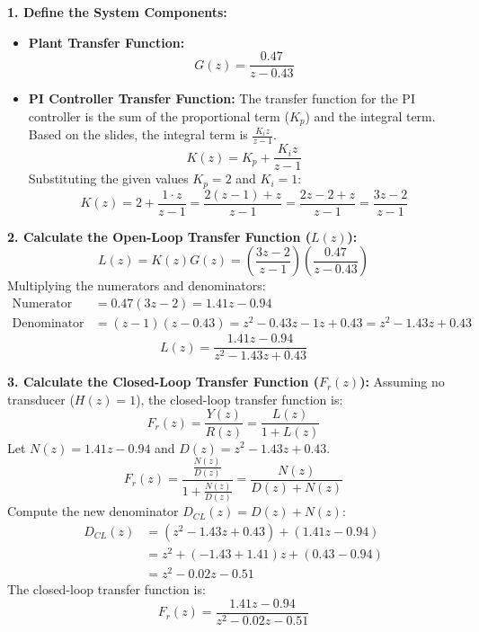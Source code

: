 \documentclass[a4paper,12pt]{article}
\begin{document}
\section{}

\textbf{1. Define the System Components:}
\begin{itemize}
    \item \textbf{Plant Transfer Function:}
    \[ G(z) = \frac{0.47}{z - 0.43} \]
    \item \textbf{PI Controller Transfer Function:}
    The transfer function for the PI controller is the sum of the proportional term ($K_p$) and the integral term. Based on the slides, the integral term is $\frac{K_i z}{z-1}$.
    \[ K(z) = K_p + \frac{K_i z}{z - 1} \]
    Substituting the given values $K_p = 2$ and $K_i = 1$:
    \[ K(z) = 2 + \frac{1 \cdot z}{z - 1} = \frac{2(z - 1) + z}{z - 1} = \frac{2z - 2 + z}{z - 1} = \frac{3z - 2}{z - 1} \]
\end{itemize}

\textbf{2. Calculate the Open-Loop Transfer Function ($L(z)$):}
\[ L(z) = K(z)G(z) = \left( \frac{3z - 2}{z - 1} \right) \left( \frac{0.47}{z - 0.43} \right) \]
Multiplying the numerators and denominators:
\begin{align*}
    \text{Numerator} &= 0.47(3z - 2) = 1.41z - 0.94 \\
    \text{Denominator} &= (z - 1)(z - 0.43) = z^2 - 0.43z - 1z + 0.43 = z^2 - 1.43z + 0.43
\end{align*}
\[ L(z) = \frac{1.41z - 0.94}{z^2 - 1.43z + 0.43} \]

\textbf{3. Calculate the Closed-Loop Transfer Function ($F_r(z)$):}
Assuming no transducer ($H(z) = 1$), the closed-loop transfer function is:
\[ F_r(z) = \frac{Y(z)}{R(z)} = \frac{L(z)}{1 + L(z)} \]
Let $N(z) = 1.41z - 0.94$ and $D(z) = z^2 - 1.43z + 0.43$.
\[ F_r(z) = \frac{\frac{N(z)}{D(z)}}{1 + \frac{N(z)}{D(z)}} = \frac{N(z)}{D(z) + N(z)} \]
Compute the new denominator $D_{CL}(z) = D(z) + N(z)$:
\begin{align*}
    D_{CL}(z) &= (z^2 - 1.43z + 0.43) + (1.41z - 0.94) \\
    &= z^2 + (-1.43 + 1.41)z + (0.43 - 0.94) \\
    &= z^2 - 0.02z - 0.51
\end{align*}
The closed-loop transfer function is:
\[ F_r(z) = \frac{1.41z - 0.94}{z^2 - 0.02z - 0.51} \]


\section{}
\end{document}
